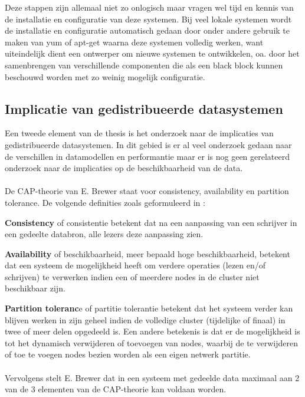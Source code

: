 \documentclass{book}
\begin{document}
Deze stappen zijn allemaal niet zo onlogisch maar vragen wel tijd en kennis van de installatie en configuratie van deze systemen. Bij veel lokale systemen wordt de installatie en configuratie automatisch gedaan door onder andere gebruik te maken van \gls{yum} of \gls{apt-get} waarna deze systemen volledig werken, want uiteindelijk dient een ontwerper om nieuwe systemen te ontwikkelen, oa. door het samenbrengen van verschillende componenten die als een black block kunnen beschouwd worden met zo weinig mogelijk configuratie. 

\subsection{Implicatie van gedistribueerde datasystemen}
Een tweede element van de thesis is het onderzoek naar de implicaties van gedistribueerde datasystemen. In dit gebied is er al veel onderzoek gedaan naar de verschillen in datamodellen en performantie maar er is nog geen gerelateerd onderzoek naar de implicaties op de beschikbaarheid van de data. 

\paragraph{}De CAP-theorie van E. Brewer\cite{Brewer:2000:TRD:343477.343502} staat voor consistency, availability en partition tolerance. De volgende definities zoals geformuleerd in \cite{Strauch.NoSQL}:


\textbf{Consistency} of consistentie betekent dat na een aanpassing van een schrijver in een gedeelte databron, alle lezers deze aanpassing zien. 

\textbf{Availability} of beschikbaarheid, meer bepaald hoge beschikbaarheid, betekent dat een systeem de mogelijkheid heeft om verdere operaties (lezen en/of schrijven) te verwerken indien een of meerdere nodes in de cluster niet beschikbaar zijn.

\textbf{Partition toleranc}e of partitie tolerantie betekent dat het systeem verder kan blijven werken in zijn geheel indien de volledige cluster (tijdelijke of finaal) in twee of meer delen opgedeeld is. Een andere betekenis is dat er de mogelijkheid is tot het dynamisch verwijderen of toevoegen van nodes, waarbij de te verwijderen of toe te voegen nodes bezien worden als een eigen netwerk partitie. 

\paragraph{} Vervolgens stelt E. Brewer dat in een systeem met gedeelde data maximaal aan 2 van de 3 elementen van de CAP-theorie kan voldaan worden. 
\end{document}
